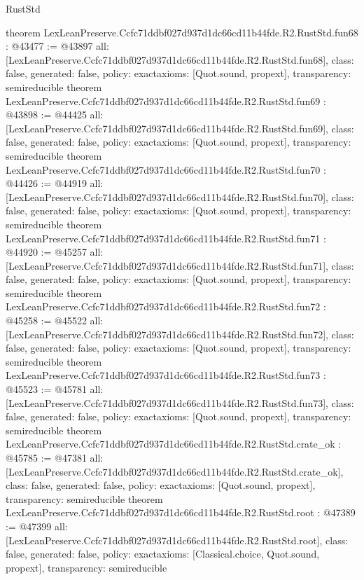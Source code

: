 \begin{lexlean}{RustStd}
\begin{coremodule}
{}
theorem LexLeanPreserve.Ccfc71ddbf027d937d1dc66cd11b44fde.R2.RustStd.fun68 : @43477 := @43897 {
  all: [LexLeanPreserve.Ccfc71ddbf027d937d1dc66cd11b44fde.R2.RustStd.fun68],
  class: false,
  generated: false,
  policy: exact{axioms: [Quot.sound, propext]},
  transparency: semireducible
}
theorem LexLeanPreserve.Ccfc71ddbf027d937d1dc66cd11b44fde.R2.RustStd.fun69 : @43898 := @44425 {
  all: [LexLeanPreserve.Ccfc71ddbf027d937d1dc66cd11b44fde.R2.RustStd.fun69],
  class: false,
  generated: false,
  policy: exact{axioms: [Quot.sound, propext]},
  transparency: semireducible
}
theorem LexLeanPreserve.Ccfc71ddbf027d937d1dc66cd11b44fde.R2.RustStd.fun70 : @44426 := @44919 {
  all: [LexLeanPreserve.Ccfc71ddbf027d937d1dc66cd11b44fde.R2.RustStd.fun70],
  class: false,
  generated: false,
  policy: exact{axioms: [Quot.sound, propext]},
  transparency: semireducible
}
theorem LexLeanPreserve.Ccfc71ddbf027d937d1dc66cd11b44fde.R2.RustStd.fun71 : @44920 := @45257 {
  all: [LexLeanPreserve.Ccfc71ddbf027d937d1dc66cd11b44fde.R2.RustStd.fun71],
  class: false,
  generated: false,
  policy: exact{axioms: [Quot.sound, propext]},
  transparency: semireducible
}
theorem LexLeanPreserve.Ccfc71ddbf027d937d1dc66cd11b44fde.R2.RustStd.fun72 : @45258 := @45522 {
  all: [LexLeanPreserve.Ccfc71ddbf027d937d1dc66cd11b44fde.R2.RustStd.fun72],
  class: false,
  generated: false,
  policy: exact{axioms: [Quot.sound, propext]},
  transparency: semireducible
}
theorem LexLeanPreserve.Ccfc71ddbf027d937d1dc66cd11b44fde.R2.RustStd.fun73 : @45523 := @45781 {
  all: [LexLeanPreserve.Ccfc71ddbf027d937d1dc66cd11b44fde.R2.RustStd.fun73],
  class: false,
  generated: false,
  policy: exact{axioms: [Quot.sound, propext]},
  transparency: semireducible
}
theorem LexLeanPreserve.Ccfc71ddbf027d937d1dc66cd11b44fde.R2.RustStd.crate_ok : @45785 := @47381 {
  all: [LexLeanPreserve.Ccfc71ddbf027d937d1dc66cd11b44fde.R2.RustStd.crate_ok],
  class: false,
  generated: false,
  policy: exact{axioms: [Quot.sound, propext]},
  transparency: semireducible
}
theorem LexLeanPreserve.Ccfc71ddbf027d937d1dc66cd11b44fde.R2.RustStd.root : @47389 := @47399 {
  all: [LexLeanPreserve.Ccfc71ddbf027d937d1dc66cd11b44fde.R2.RustStd.root],
  class: false,
  generated: false,
  policy: exact{axioms: [Classical.choice, Quot.sound, propext]},
  transparency: semireducible
}


\end{coremodule}
\end{lexlean}
